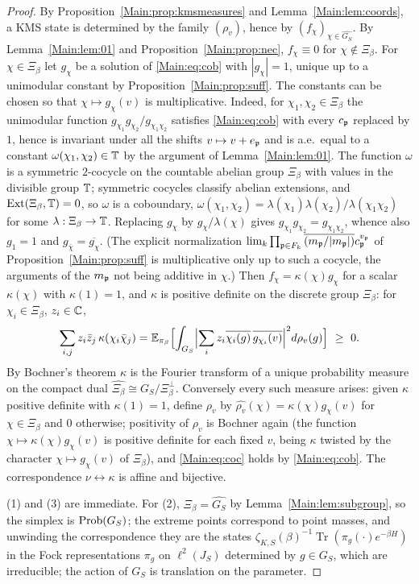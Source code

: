 \begin{proof}
By Proposition~\ref{Main:prop:kmsmeasures} and Lemma~\ref{Main:lem:coords}, a KMS state
is determined by the family $(\rho_v)$, hence by $(f_\chi)_{\chi\in\widehat{G_S}}$.
By Lemma~\ref{Main:lem:01} and Proposition~\ref{Main:prop:nec}, $f_\chi\equiv0$ for
$\chi\notin\Xi_\beta$. For $\chi\in\Xi_\beta$ let $g_\chi$ be a solution of \eqref{Main:eq:cob} with $|g_\chi|=1$,
unique up to a unimodular constant by Proposition~\ref{Main:prop:suff}. The constants can be
chosen so that $\chi\mapsto g_\chi(v)$ is multiplicative. Indeed, for
$\chi_1,\chi_2\in\Xi_\beta$ the unimodular function $g_{\chi_1}g_{\chi_2}/g_{\chi_1\chi_2}$
satisfies \eqref{Main:eq:cob} with every $c_{\mathfrak{p}}$ replaced by $1$, hence is invariant under all the
shifts $v\mapsto v+e_{\mathfrak{p}}$ and is a.e.\ equal to a constant $\omega(\chi_1,\chi_2)\in\mathbb{T}$ by
the argument of Lemma~\ref{Main:lem:01}. The function $\omega$ is a symmetric $2$-cocycle on the
countable abelian group $\Xi_\beta$ with values in the divisible group $\mathbb{T}$; symmetric
cocycles classify abelian extensions, and $\operatorname{Ext}(\Xi_\beta,\mathbb{T})=0$, so $\omega$
is a coboundary, $\omega(\chi_1,\chi_2)=\lambda(\chi_1)\lambda(\chi_2)/\lambda(\chi_1\chi_2)$
for some $\lambda:\Xi_\beta\to\mathbb{T}$. Replacing $g_\chi$ by $g_\chi/\lambda(\chi)$ gives
$g_{\chi_1}g_{\chi_2}=g_{\chi_1\chi_2}$, whence also $g_1=1$ and
$g_{\bar\chi}=\overline{g_\chi}$. (The explicit normalization
$\lim_k\prod_{\mathfrak{p}\in F_k}\overline{(m_{\mathfrak{p}}/|m_{\mathfrak{p}}|)}c_{\mathfrak{p}}^{v_{\mathfrak{p}}}$ of
Proposition~\ref{Main:prop:suff} is multiplicative only up to such a cocycle, the arguments of
the $m_{\mathfrak{p}}$ not being additive in $\chi$.) Then
$f_\chi=\kappa(\chi)g_\chi$ for a scalar $\kappa(\chi)$ with $\kappa(1)=1$, and
$\kappa$ is positive definite on the discrete group $\Xi_\beta$: for
$\chi_i\in\Xi_\beta$, $z_i\in\mathbb{C}$,
\[
\sum_{i,j}z_i\bar z_j\,\kappa(\chi_i\bar\chi_j)
=\mathbb E_{\pi_\beta}\Bigl[\int_{G_S}\Bigl|\sum_iz_i\overline{\chi_i(g)}\,\overline{g_{\chi_i}(v)}\Bigr|^2d\rho_v(g)\Bigr]\ \ge\ 0 .
\]
By Bochner's theorem $\kappa$ is the Fourier transform of a unique probability
measure on the compact dual $\widehat{\Xi_\beta}\cong G_S/\Xi_\beta^\perp$.
Conversely every such measure arises: given $\kappa$ positive definite with
$\kappa(1)=1$, define $\rho_v$ by
$\widehat{\rho_v}(\chi)=\kappa(\chi)g_\chi(v)$ for $\chi\in\Xi_\beta$ and $0$
otherwise; positivity of $\rho_v$ is Bochner again (the function
$\chi\mapsto\kappa(\chi)g_\chi(v)$ is positive definite for each fixed $v$,
being $\kappa$ twisted by the character $\chi\mapsto g_\chi(v)$ of
$\Xi_\beta$), and \eqref{Main:eq:coc} holds by \eqref{Main:eq:cob}. The correspondence
$\nu\leftrightarrow\kappa$ is affine and bijective.

(1) and (3) are immediate. For (2), $\Xi_\beta=\widehat{G_S}$ by
Lemma~\ref{Main:lem:subgroup}, so the simplex is $\mathrm{Prob}(G_S)$; the extreme points
correspond to point masses, and unwinding the correspondence they are the
states $\zeta_{K,S}(\beta)^{-1}\operatorname{Tr}(\pi_g(\cdot)e^{-\beta H})$ in
the Fock representations $\pi_g$ on $\ell^2(J_S)$ determined by $g\in G_S$,
which are irreducible; the action of $G_S$ is translation on the parameter.
\end{proof}

